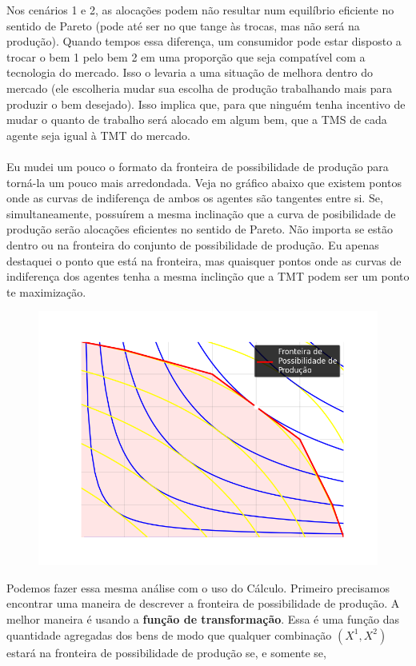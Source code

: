 \documentclass[a4paper,11pt,oneside]{book}
\theoremstyle{definition}
\theoremstyle{break}
\begin{document}
Nos cenários 1 e 2, as alocações podem não resultar num equilíbrio eficiente no sentido de Pareto (pode até ser no que tange às trocas, mas não será na produção). Quando tempos essa diferença, um consumidor pode estar disposto a trocar o bem 1 pelo bem 2 em uma proporção que seja compatível com a tecnologia do mercado. Isso o levaria a uma situação de melhora dentro do mercado (ele escolheria mudar sua escolha de produção trabalhando mais para produzir o bem desejado). Isso implica que, para que ninguém tenha incentivo de mudar o quanto de trabalho será alocado em algum bem, que a TMS de cada agente seja igual à TMT do mercado.
\\
\\
Eu mudei um pouco o formato da fronteira de possibilidade de produção para torná-la um pouco mais arredondada. Veja no gráfico abaixo que existem pontos onde as curvas de indiferença de ambos os agentes são tangentes entre si. Se, simultaneamente, possuírem a mesma inclinação que a curva de posibilidade de produção serão alocações eficientes no sentido de Pareto. Não importa se estão dentro ou na fronteira do conjunto de possibilidade de produção. Eu apenas destaquei o ponto que está na fronteira, mas quaisquer pontos onde as curvas de indiferença dos agentes tenha a mesma inclinção que a TMT podem ser um ponto te maximização.

\begin{figure}[H]
	\centering
	\includegraphics[scale=0.6]{cap33_11-edgeworth_prod.png}
\end{figure}

Podemos fazer essa mesma análise com o uso do Cálculo. Primeiro precisamos encontrar uma maneira de descrever a fronteira de possibilidade de produção. A melhor maneira é usando a \textbf{função de transformação}. Essa é uma função das quantidade agregadas dos bens de modo que qualquer combinação $(X^1,X^2)$ estará na fronteira de possibilidade de produção se, e somente se,
\end{document}
